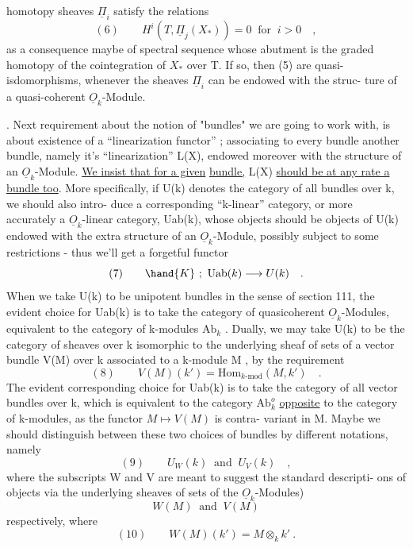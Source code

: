 
homotopy sheaves $\underline{\Pi}_i$ satisfy the relations
\[ (6) \qquad H^i(T, \underline{\Pi}_j(X_*)) = 0 \ \text{ for } \ i > 0 \quad , \]
as a consequence maybe of  spectral sequence whose abutment is the graded
homotopy of the cointegration of $X_*$ over T. If so, then (5) are quasi-%
isdomorphisms, whenever  the sheaves $\underline{\Pi}_i$ can be endowed with the struc-%
ture of a quasi-coherent $\underline{O}_k$-Module.

. Next requirement about the notion of "bundles" we are going to work
with, is about existence of a ``linearization functor'' ; associating to
every bundle another bundle, namely it's ``linearization'' L(X), endowed
moreover with the structure of an $\underline{O}_k$-Module. \uline{We insist that for a given}
\uline{bundle,} L(X) \uline{should be at any rate a bundle too}. More specifically,
if U(k) denotes the category of all bundles over k, we should also intro-%
duce a corresponding ``k-linear'' category, or more accurately a $\underline{O}_k$-linear
category, Uab(k), whose objects should be objects of U(k) endowed
with the extra structure of an $\underline{O}_k$-Module, possibly subject to some 
restrictions -  thus we'll get a forgetful functor
\[ (7) \qquad \hand{K} \ ; \ \mathrm{Uab}(k) \longrightarrow U(k) \quad . \]
When we take U(k) to be unipotent bundles in the sense of section 111,
the evident choice for Uab(k) is to take the category of quasicoherent
$\underline{O}_k$-Modules, equivalent to the category of k-modules $\mathrm{Ab}_k$ . Dually,
we may take U(k) to be the category of sheaves over k isomorphic to the
underlying sheaf of sets of a vector bundle  V(M) over k associated
to a k-module M , by the requirement
\[ (8) \qquad V(M)(k') = \mathrm{Hom}_{k\text{-mod}}(M,k') \quad . \]
The evident corresponding choice for Uab(k) is to take the category of
all vector bundles over k, which is equivalent to the category $\mathrm{Ab}_k^{o}$
\uline{opposite} to the category of k-modules, as the functor $M \mapsto V(M)$ is contra-%
variant in M. Maybe we should distinguish between these two choices
of bundles by different notations, namely
\[ (9) \qquad U_W(k) \ \text{ and } \ U_V(k) \quad , \]
where the subscripts W and V are meant to suggest the standard descripti-%
ons of objects via \hand{(}the \deleted{(}underlying sheaves of sets of the $\underline{O}_k$-Modules)
\[ W(M) \ \text{ and } \ V(M) \]
respectively, where 
\[ (10) \qquad W(M)(k') = M \otimes_k k' \ . \]
